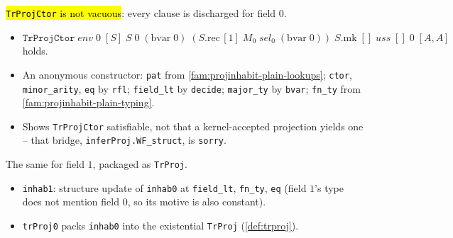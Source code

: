 \begin{example}
  \label{thm:projinhabit-plain-inhab0}
  \leanok

   \hl{\texttt{TrProjCtor} is not vacuous}: every clause is discharged for field
  $0$.
  \begin{itemize}
  \item $\mathtt{TrProjCtor}\;\mathit{env}\;0\;[S]\;S\;0\;(\mathrm{bvar}\;0)\;
        (S.\mathrm{rec}\,[1]\;M_0\;\mathit{sel}_0\;(\mathrm{bvar}\;0))\;S.\mathrm{mk}\;[]\;
        \mathit{uss}\;[]\;0\;[A,A]$ holds.
  \item An anonymous constructor: \texttt{pat} from \ref{fam:projinhabit-plain-lookups};
        \texttt{ctor}, \texttt{minor\_arity}, \texttt{eq} by \texttt{rfl}; \texttt{field\_lt} by
        \texttt{decide}; \texttt{major\_ty} by \texttt{bvar}; \texttt{fn\_ty} from
        \ref{fam:projinhabit-plain-typing}.
  \item {} Shows \texttt{TrProjCtor} satisfiable, not that a kernel-accepted projection
        yields one -- that bridge, \texttt{inferProj.WF\_struct}, is \texttt{sorry}.
  \end{itemize}
\end{example}

\begin{example}
  \label{thm:projinhabit-plain-inhab1}
  \leanok

   The same for field $1$, packaged as \texttt{TrProj}.
  \begin{itemize}
  \item \texttt{inhab1}: structure update of \texttt{inhab0} at \texttt{field\_lt},
        \texttt{fn\_ty}, \texttt{eq} (field $1$'s type does not mention field $0$, so its motive is
        also constant).
  \item \texttt{trProj0} packs \texttt{inhab0} into the existential \texttt{TrProj}
        (\ref{def:trproj}).
  \end{itemize}
\end{example}

